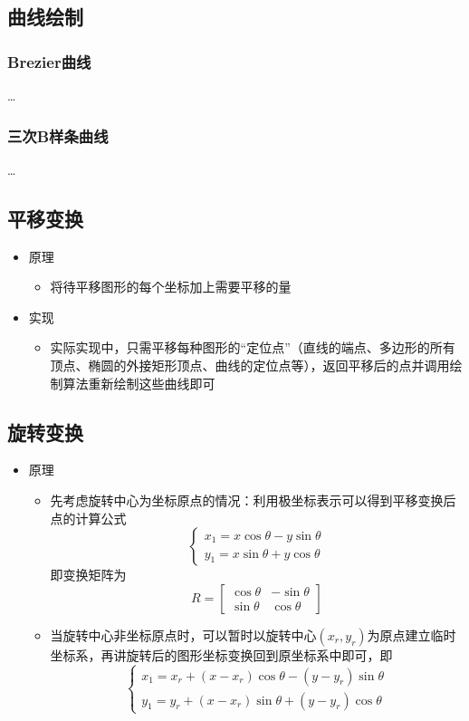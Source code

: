 \documentclass[a4paper,UTF8]{article}
\theoremstyle{definition}
\begin{document}
\subsection{曲线绘制}
\subsubsection{Brezier曲线}
\dots
\subsubsection{三次B样条曲线}
\dots

\subsection{平移变换}
\begin{itemize}
  \item 原理
  \begin{itemize}
    \item 将待平移图形的每个坐标加上需要平移的量
  \end{itemize}
  \item 实现
  \begin{itemize}
    \item 实际实现中，只需平移每种图形的“定位点”（直线的端点、多边形的所有顶点、椭圆的外接矩形顶点、曲线的定位点等），返回平移后的点并调用绘制算法重新绘制这些曲线即可
  \end{itemize}
\end{itemize}

\subsection{旋转变换}
\begin{itemize}
  \item 原理
  \begin{itemize}
    \item 先考虑旋转中心为坐标原点的情况：利用极坐标表示可以得到平移变换后点的计算公式
    $$\begin{cases}
      x_1=x\cos\theta-y\sin\theta\\
      y_1=x\sin\theta+y\cos\theta
    \end{cases}$$
    即变换矩阵为$$R=\begin{bmatrix}
      \cos\theta & -\sin\theta\\
      \sin\theta & \cos\theta
      \end{bmatrix}$$
    \item 当旋转中心非坐标原点时，可以暂时以旋转中心$(x_r,y_r)$为原点建立临时坐标系，再讲旋转后的图形坐标变换回到原坐标系中即可，即
    $$\begin{cases}
      x_1=x_r+(x-x_r)\cos\theta-(y-y_r)\sin\theta\\
      y_1=y_r+(x-x_r)\sin\theta+(y-y_r)\cos\theta
    \end{cases}$$
  \end{itemize}
\end{itemize}
\end{document}
